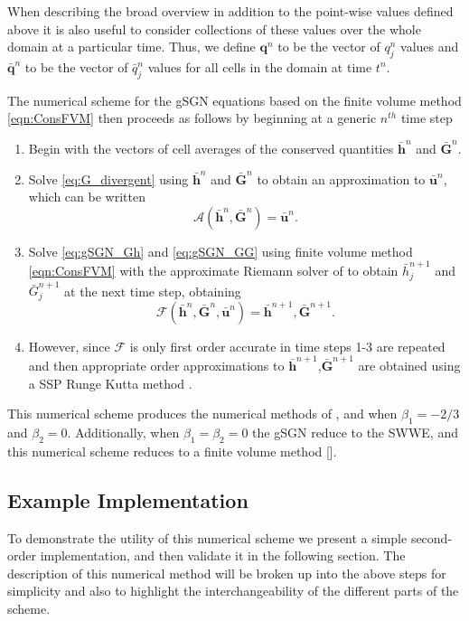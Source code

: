 \documentclass[10pt]{elsarticle}
\newcommand{\vecn}[1]{\boldsymbol{#1}}
\begin{document}
When describing the broad overview in addition to the point-wise values defined above it is also useful to consider collections of these values over the whole domain at a particular time. Thus, we define $\vecn{q}^n$ to be the vector of $q^n_j$ values and $\bar{\vecn{q}}^n$ to be the vector of $\bar{q}^n_j$ values for all cells in the domain at time $t^n$. 

The numerical scheme for the gSGN equations based on the finite volume method \eqref{eqn:ConsFVM} then proceeds as follows by beginning at a generic $n^{th}$ time step
\begin{enumerate}
	\item Begin with the vectors of cell averages of the conserved quantities $\bar{\vecn{h}}^n$ and $\bar{\vecn{G}}^n$.
	\item Solve \eqref{eq:G_divergent} using $\bar{\vecn{h}}^n$ and $\bar{\vecn{G}}^n$ to obtain an approximation to $\bar{{\vecn{u}}}^n$, which can be written
	\[\mathcal{A}\left(\bar{\vecn{h}}^n,\bar{\vecn{G}}^n\right) = \bar{{\vecn{u}}}^n.\]
	\item Solve \eqref{eq:gSGN_Gh} and \eqref{eq:gSGN_GG} using finite volume method \eqref{eqn:ConsFVM}  with the approximate Riemann solver of \citet{Kurganov-etal-2001-707} to obtain $\bar{h}^{n+1}_j$ and $\bar{G}^{n+1}_j$ at the next time step, obtaining
	\[\mathcal{F}\left(\bar{\vecn{h}}^n,\bar{\vecn{G}}^n,\bar{{\vecn{u}}}^n\right) = \bar{\vecn{h}}^{n+1 },\bar{\vecn{G}}^{n+1}.\]
	\item However, since $\mathcal{F}$ is only first order accurate in time steps 1-3 are repeated and then appropriate order approximations to $\bar{\vecn{h}}^{n+1 }$,$\bar{\vecn{G}}^{n+1}$ are obtained using a SSP Runge Kutta method \cite{Gottlieb-etal-2003-89}. 
\end{enumerate}

This numerical scheme produces the numerical methods of \citet{Hank-etal-2010-2034}, \citet{Zoppou-etal-2017} and \citet{Pitt-2019} when $\beta_1 = -2/3$ and $\beta_2 = 0$. Additionally, when $\beta_1 = \beta_2 = 0$ the gSGN reduce to the SWWE, and this numerical scheme reduces to a finite volume method [].  

\subsection{Example Implementation}
To demonstrate the utility of this numerical scheme we present a simple second-order implementation, and then validate it in the following section. The description of this numerical method will be broken up into the above steps for simplicity and also to highlight the interchangeability of the different parts of the scheme.
\end{document}
